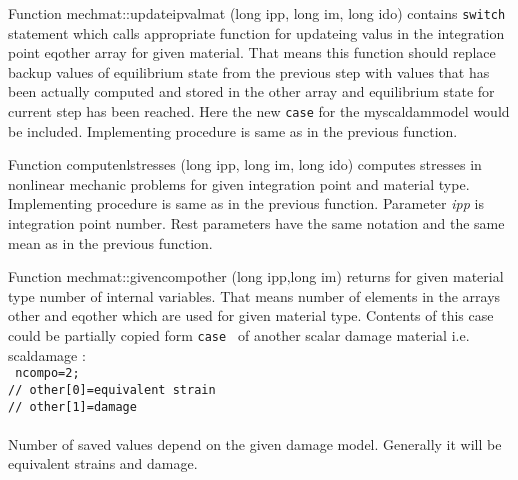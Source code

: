 Function {\sf mechmat::updateipvalmat (long ipp, long im, long ido)} contains {\tt switch} statement which calls appropriate function 
for updateing valus in the integration point {\sf eqother} array for given material. That means this function should replace backup values 
of equilibrium state from the previous step with values that has been actually computed and stored in the {\sf other} array and equilibrium state 
for current step has been reached. Here the new {\tt case} for the  {\sf myscaldammodel} would be included. Implementing procedure is same
as in the previous function.

Function {\sf computenlstresses (long ipp, long im, long ido)} computes stresses in nonlinear mechanic problems for given integration
point and material type. Implementing procedure is same as in the previous function. Parameter {\it ipp} is integration
point number. Rest parameters have the same notation and the same mean as in the previous function.

Function {\sf mechmat::givencompother (long ipp,long im)} returns for given material type number of internal variables. That means
number of elements in the arrays {\sf other} and {\sf eqother} which are used for given material type.
Contents of this case could be partially copied form {\tt case } of another scalar damage
material i.e. scaldamage :\\
{\tt
    ncompo=2;\\
    //  other[0]=equivalent strain\\
    //  other[1]=damage\\
}\\
Number of saved values depend on the given damage model. Generally it will be equivalent strains and damage.

